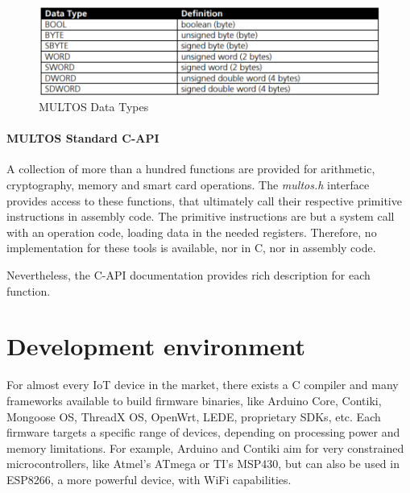 \begin{figure}[bth]
	\begin{center}
		\includegraphics[width=\linewidth]{gfx/multosDataTypes}
	\end{center}
	\caption{MULTOS Data Types}
	\label{fig:multosDataTypes}
\end{figure}


\paragraph{MULTOS Standard C-API}

A collection of more than a hundred functions are provided for arithmetic, cryptography, memory and smart card operations. The \textit{multos.h} interface provides access to these functions, that ultimately call their respective primitive instructions in assembly code. The primitive instructions are but a system call with an operation code, loading data in the needed registers. Therefore,  no implementation for these tools is available, nor in C, nor in assembly code.

Nevertheless, the C-API documentation \citep{MultosTechLib} provides rich description for each function.




\hfil

\section{Development environment}


For almost every IoT device in the market, there exists a C compiler and many frameworks available to build firmware binaries, like Arduino Core, Contiki, Mongoose OS, ThreadX OS, OpenWrt, LEDE, proprietary SDKs, etc. Each firmware targets a specific range of devices, depending on processing power and memory limitations. For example, Arduino and Contiki aim for very constrained microcontrollers, like Atmel's ATmega or TI's MSP430, but can also be used in ESP8266, a more powerful device, with WiFi capabilities.

